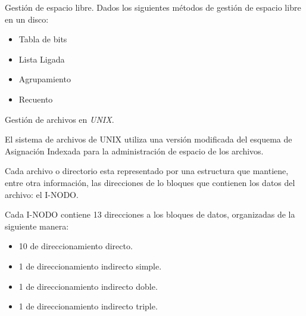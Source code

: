 \begin{questions}

\question Gestión de espacio libre.  Dados los siguientes métodos de gestión de espacio libre en un disco:
\begin{itemize}
	\item Tabla de bits
	\item Lista Ligada
	\item Agrupamiento
	\item Recuento
\end{itemize}

\question Gestión de archivos en \textit{UNIX}. 

\hspace{20pt} El sistema de archivos de UNIX utiliza una versión modificada del esquema de Asignación Indexada para la administración de espacio de los archivos.

\hspace{20pt} Cada archivo o directorio esta representado por una estructura que mantiene, entre otra información, las direcciones de lo bloques que contienen los datos del archivo: el I-NODO.

\hspace{20pt}  Cada I-NODO contiene 13 direcciones a los bloques de datos, organizadas de la siguiente
manera:
\begin{itemize}
	\item 10 de direccionamiento directo.
	\item 1 de direccionamiento indirecto simple.
	\item 1 de direccionamiento indirecto doble.
	\item 1 de direccionamiento indirecto triple.
\end{itemize}
\begin{parts}

\end{parts}
\end{questions}
